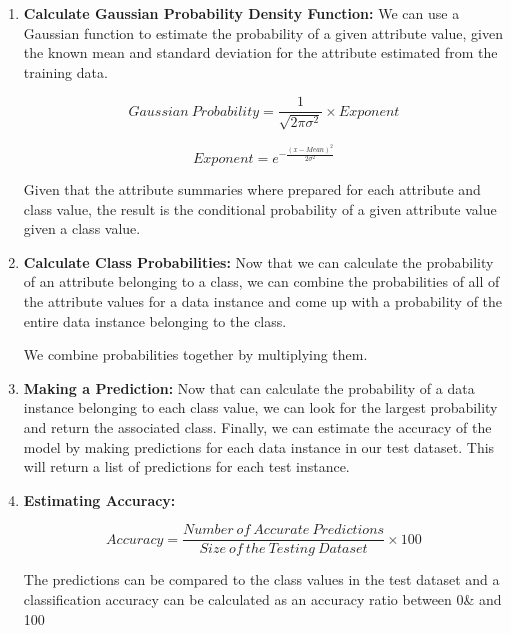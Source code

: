 \begin{enumerate}
    \item \textbf{Calculate Gaussian Probability Density Function:} We can use a Gaussian function to estimate the probability of a given attribute value, given the known mean and standard deviation for the attribute estimated from the training data.


\begin{equation}
    Gaussian\ Probability = \frac{1}{\sqrt{2\pi \sigma^{2}}} \times Exponent
\end{equation}

\begin{equation}
    Exponent = e^{-\frac{(x-Mean)^{2}}{2 \sigma^{2}}}
\end{equation}



Given that the attribute summaries where prepared for each attribute and class value, the result is the conditional probability of a given attribute value given a class value. 

\item \textbf{Calculate Class Probabilities:} Now that we can calculate the probability of an attribute belonging to a class, we can combine the probabilities of all of the attribute values for a data instance and come up with a probability of the entire data instance belonging to the class.

We combine probabilities together by multiplying them. 

\item \textbf{Making a Prediction:}
Now that can calculate the probability of a data instance belonging to each class value, we can look for the largest probability and return the associated class.
Finally, we can estimate the accuracy of the model by making predictions for each data instance in our test dataset. This will return a list of predictions for each test instance.


\item \textbf{Estimating Accuracy:} 

\begin{equation}
Accuracy = \frac{Number\ of\ Accurate\ Predictions}{Size\ of\ the\ Testing\ Dataset}\times100
\end{equation}

The predictions can be compared to the class values in the test dataset and a classification accuracy can be calculated as an accuracy ratio between 0& and 100%

\end{enumerate}



